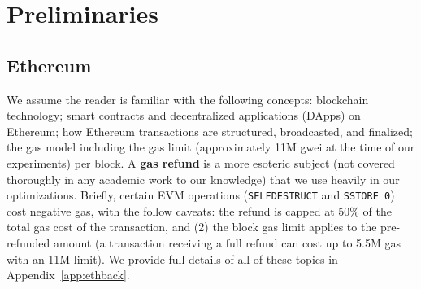 


\section{Preliminaries}

\subsection{Ethereum}

We assume the reader is familiar with the following concepts: blockchain technology; smart contracts and decentralized applications (DApps) on Ethereum; how Ethereum transactions are structured, broadcasted, and finalized; the gas model including the gas limit (approximately 11M gwei at the time of our experiments) per block. A \textbf{gas refund} is a more esoteric subject (not covered thoroughly in any academic work to our knowledge) that we use heavily in our optimizations. Briefly, certain EVM operations (\texttt{SELFDESTRUCT} and \texttt{SSTORE 0}) cost negative gas, with the follow caveats: the refund is capped at 50\% of the total gas cost of the transaction, and (2) the block gas limit applies to the pre-refunded amount (\ie a transaction receiving a full refund can cost up to 5.5M gas with an 11M limit). We provide full details of all of these topics in Appendix~\ref{app:ethback}. 

